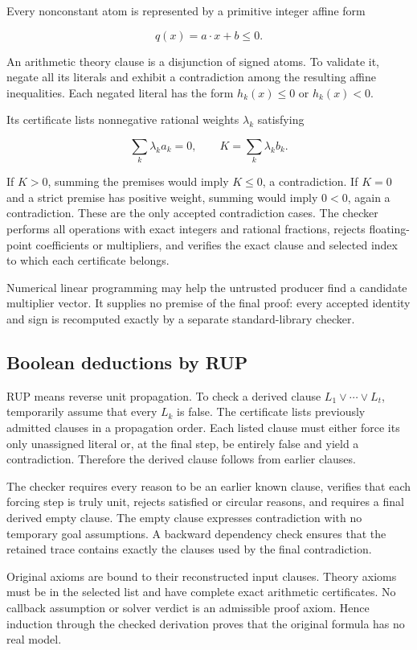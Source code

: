 \documentclass[
  11pt,
]{article}
\begin{document}
Every nonconstant atom is represented by a primitive integer affine form

\[
q(x)=a\cdot x+b\le0.
\]

An arithmetic theory clause is a disjunction of signed atoms. To
validate it, negate all its literals and exhibit a contradiction among
the resulting affine inequalities. Each negated literal has the form
\(h_k(x)\le0\) or \(h_k(x)<0\).

Its certificate lists nonnegative rational weights \(\lambda_k\)
satisfying

\[
\sum_k\lambda_k a_k=0,\qquad K=\sum_k\lambda_k b_k.
\]

If \(K>0\), summing the premises would imply \(K\le0\), a contradiction.
If \(K=0\) and a strict premise has positive weight, summing would imply
\(0<0\), again a contradiction. These are the only accepted
contradiction cases. The checker performs all operations with exact
integers and rational fractions, rejects floating-point coefficients or
multipliers, and verifies the exact clause and selected index to which
each certificate belongs.

Numerical linear programming may help the untrusted producer find a
candidate multiplier vector. It supplies no premise of the final proof:
every accepted identity and sign is recomputed exactly by a separate
standard-library checker.

\subsection{Boolean deductions by RUP}\label{boolean-deductions-by-rup}

RUP means reverse unit propagation. To check a derived clause
\(L_1\lor\cdots\lor L_t\), temporarily assume that every \(L_k\) is
false. The certificate lists previously admitted clauses in a
propagation order. Each listed clause must either force its only
unassigned literal or, at the final step, be entirely false and yield a
contradiction. Therefore the derived clause follows from earlier
clauses.

The checker requires every reason to be an earlier known clause,
verifies that each forcing step is truly unit, rejects satisfied or
circular reasons, and requires a final derived empty clause. The empty
clause expresses contradiction with no temporary goal assumptions. A
backward dependency check ensures that the retained trace contains
exactly the clauses used by the final contradiction.

Original axioms are bound to their reconstructed input clauses. Theory
axioms must be in the selected list and have complete exact arithmetic
certificates. No callback assumption or solver verdict is an admissible
proof axiom. Hence induction through the checked derivation proves that
the original formula has no real model.
\end{document}
